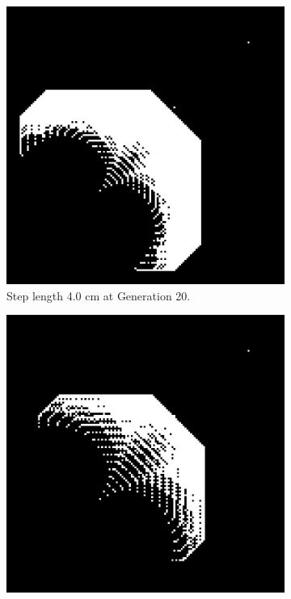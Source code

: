\begin{figure}[H]
    \centering
    \begin{subfigure}{0.3\textwidth}
        \centering
        \includegraphics[width=\textwidth]{Images/Algorithm_obs/graph/Setting_step_length_for_graph_generation/60_dist_4_step_len_time_5.54_under.png}
        \caption{Step length 4.0 cm at Generation 20.}
    \end{subfigure} 
    \hfill
    \begin{subfigure}{0.3\textwidth}
        \centering
        \includegraphics[width=\textwidth]{Images/Algorithm_obs/graph/Setting_step_length_for_graph_generation/60_dist_4.96_step_len_time_0.47_perfect.png}

\end{subfigure}
\end{figure}
